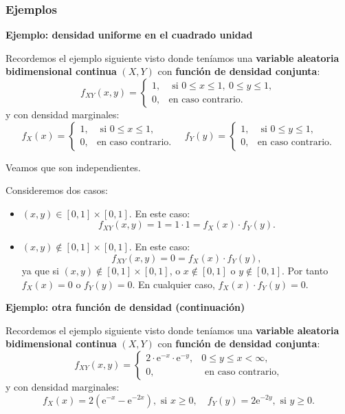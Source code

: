 \documentclass[
  letterpaper,
  DIV=11,
  numbers=noendperiod]{scrreprt}
\begin{document}
\hypertarget{ejemplos-2}{%
\subsubsection{Ejemplos}\label{ejemplos-2}}

\textbf{Ejemplo: densidad uniforme en el cuadrado unidad}

Recordemos el ejemplo siguiente visto donde teníamos una
\textbf{variable aleatoria bidimensional continua} \((X,Y)\) con
\textbf{función de densidad conjunta}: \[
f_{XY}(x,y)=\begin{cases}
1, & \mbox{ si }0\leq x\leq 1,\ 0\leq y\leq 1, \\
0, & \mbox{en caso contrario.}
\end{cases}
\] y con densidad marginales: \[
f_{X}(x)=\begin{cases}
1, & \mbox{ si }0\leq x\leq 1,\\
0, & \mbox{en caso contrario.}
\end{cases}\quad f_{Y}(y)=\begin{cases}
1, & \mbox{ si }0\leq y\leq 1,\\
0, & \mbox{en caso contrario.}
\end{cases}
\]

Veamos que son independientes.

Consideremos dos casos:

\begin{itemize}
\item
  \((x,y)\in [0,1]\times [0,1]\). En este caso: \[
  f_{XY}(x,y) =1 =1\cdot 1=f_X(x)\cdot f_Y(y).
  \]
\item
  \((x,y)\not\in [0,1]\times [0,1]\). En este caso: \[
  f_{XY}(x,y) =0 = f_X(x)\cdot f_Y(y),
  \] ya que si \((x,y)\not\in [0,1]\times [0,1]\), o \(x\not\in [0,1]\)
  o \(y\not\in [0,1]\). Por tanto \(f_X(x)=0\) o \(f_Y(y)=0\). En
  cualquier caso, \(f_X(x)\cdot f_Y(y)=0\).
\end{itemize}

\textbf{Ejemplo: otra función de densidad (continuación)}

Recordemos el ejemplo siguiente visto donde teníamos una
\textbf{variable aleatoria bidimensional continua} \((X,Y)\) con
\textbf{función de densidad conjunta}: \[
f_{XY}(x,y)=\begin{cases}
2 \cdot \mathrm{e}^{-x}\cdot\mathrm{e}^{-y}, & 0\leq y\leq x < \infty,\\
0, & \mbox{ en caso contrario,}
\end{cases}
\] y con densidad marginales: \[
f_X(x)  = 2\left(\mathrm{e}^{-x}-\mathrm{e}^{-2x}\right),\mbox{ si }x\geq 0, \quad
f_Y(y)  =  2\mathrm{e}^{-2y}, \mbox{ si }y\geq 0.
\]
\end{document}
